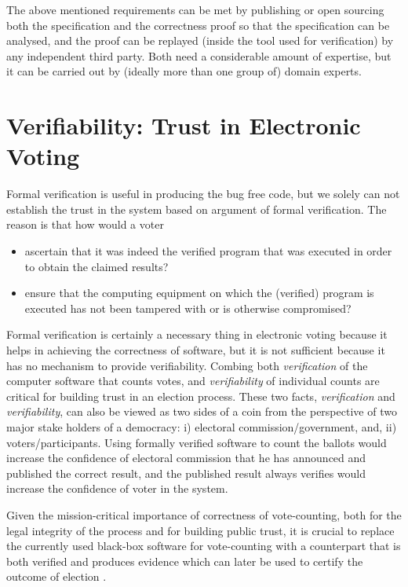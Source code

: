 	\noindent
	The above mentioned requirements can be met by publishing or open sourcing
	both the
	specification and the correctness proof so that the specification
	can be analysed, and the proof can be replayed (inside the tool used for 
	verification) by any independent third party. Both need a
	considerable amount of expertise, but it can be carried out by (ideally
	more than one group of) domain experts.
	

	
	  
	 
		
 \section{Verifiability: Trust in Electronic Voting}
 \label{sec:varifiability}
  Formal verification is useful in producing the 
   bug free code, but we solely can not 
   establish the trust in the system based on argument of 
   formal verification. The reason is that how would a voter
   \begin{itemize}
   \item ascertain that it was indeed the verified program that was
	executed in order to obtain the claimed results?
	
   \item ensure that the computing equipment on which the (verified)
	program is executed has not been tampered with or is otherwise
	compromised?
	
   \end{itemize}
   
   \noindent
   Formal verification is certainly a necessary thing in electronic voting because 
   it helps in achieving the correctness of software, but it is not sufficient because
   it has no mechanism to provide  verifiability.
   Combing both \emph{verification} of the
	computer software that counts votes, and
	\emph{verifiability} of individual counts are critical for
	building trust in an election process. These two facts, 
	 \emph{verification}  and \emph{verifiability}, 
	 can also be viewed as 
    two sides of a coin from the perspective of two major stake holders of 
    a democracy: i) electoral commission/government, and, ii) voters/participants.  
    Using formally 
    verified software to count the ballots would increase the confidence 
    of electoral commission that he has announced and published the correct result, and 
    the published result always verifies would increase the confidence
    of voter in the system. 
	 
	 
	Given the mission-critical importance of
	 correctness of vote-counting,
	both for the legal integrity of the process and for
	building public trust,  it is crucial to replace the
	currently used black-box software for vote-counting with a
	counterpart that is both verified and produces 
	evidence which can later be used to certify
	the outcome of election \citep{Bernhard:2017:PES} \citep{Rivest:2008:PTRS}.
	
